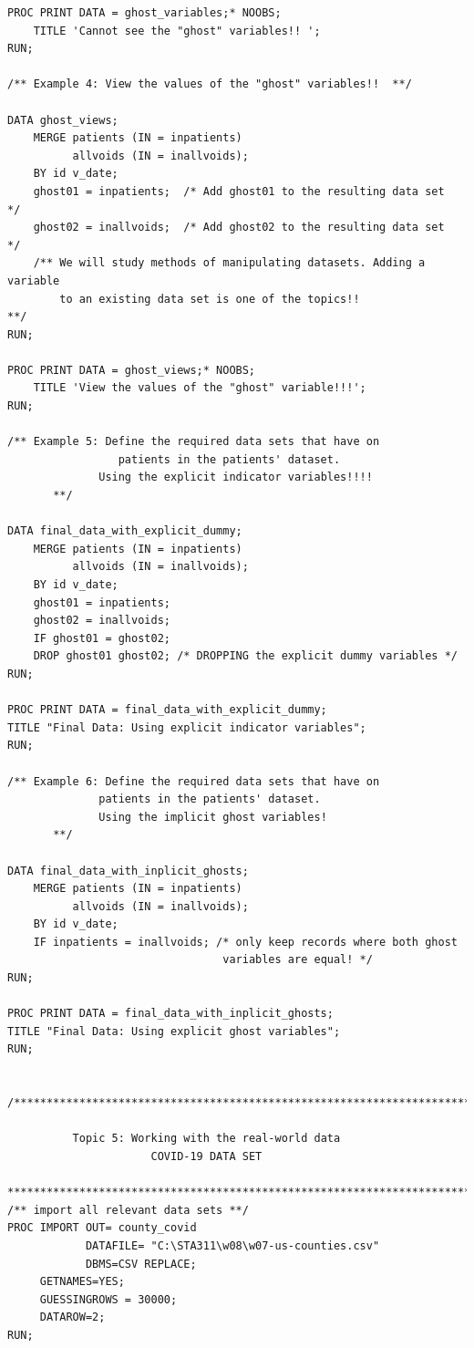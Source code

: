 \documentclass[
]{book}
\begin{document}
\begin{verbatim}
PROC PRINT DATA = ghost_variables;* NOOBS; 
    TITLE 'Cannot see the "ghost" variables!! '; 
RUN;

/** Example 4: View the values of the "ghost" variables!!  **/

DATA ghost_views;
    MERGE patients (IN = inpatients)
          allvoids (IN = inallvoids);
    BY id v_date;
    ghost01 = inpatients;  /* Add ghost01 to the resulting data set  */
    ghost02 = inallvoids;  /* Add ghost02 to the resulting data set  */
    /** We will study methods of manipulating datasets. Adding a variable
        to an existing data set is one of the topics!!              **/
RUN;
      
PROC PRINT DATA = ghost_views;* NOOBS; 
    TITLE 'View the values of the "ghost" variable!!!'; 
RUN;

/** Example 5: Define the required data sets that have on 
                 patients in the patients' dataset.  
              Using the explicit indicator variables!!!! 
       **/

DATA final_data_with_explicit_dummy;
    MERGE patients (IN = inpatients)
          allvoids (IN = inallvoids);
    BY id v_date;
    ghost01 = inpatients;
    ghost02 = inallvoids;
    IF ghost01 = ghost02;
    DROP ghost01 ghost02; /* DROPPING the explicit dummy variables */
RUN;

PROC PRINT DATA = final_data_with_explicit_dummy;
TITLE "Final Data: Using explicit indicator variables";
RUN;

/** Example 6: Define the required data sets that have on
              patients in the patients' dataset.
              Using the implicit ghost variables! 
       **/

DATA final_data_with_inplicit_ghosts;
    MERGE patients (IN = inpatients)
          allvoids (IN = inallvoids);
    BY id v_date;
    IF inpatients = inallvoids; /* only keep records where both ghost 
                                 variables are equal! */
RUN;

PROC PRINT DATA = final_data_with_inplicit_ghosts;
TITLE "Final Data: Using explicit ghost variables";
RUN;


/*****************************************************************************

          Topic 5: Working with the real-world data
                      COVID-19 DATA SET 

******************************************************************************/
/** import all relevant data sets **/
PROC IMPORT OUT= county_covid 
            DATAFILE= "C:\STA311\w08\w07-us-counties.csv" 
            DBMS=CSV REPLACE;
     GETNAMES=YES;
     GUESSINGROWS = 30000;
     DATAROW=2; 
RUN;


\end{verbatim}
\end{document}
